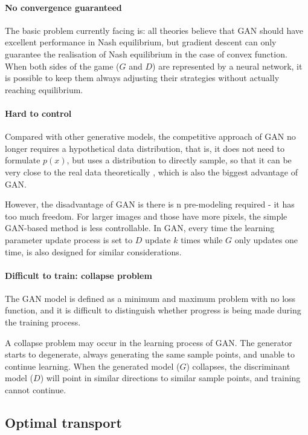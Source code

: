 \documentclass{article}
\begin{document}
\paragraph{No convergence guaranteed}
The basic problem currently facing is: all theories believe that GAN should have excellent performance in Nash equilibrium, but gradient descent can only guarantee the realisation of Nash equilibrium in the case of convex function. When both sides of the game ($G$ and $D$) are represented by a neural network, it is possible to keep them always adjusting their strategies without actually reaching equilibrium.

\paragraph{Hard to control}
Compared with other generative models, the competitive approach of GAN no longer requires a hypothetical data distribution, that is, it does not need to formulate $p(x)$, but uses a distribution to directly sample, so that it can be very close to the real data theoretically , which is also the biggest advantage of GAN.

However, the disadvantage of GAN is there is n pre-modeling required - it has too much freedom. For larger images and those have more pixels, the simple GAN-based method is less controllable. In GAN, every time the learning parameter update process is set to $D$ update $k$ times while $G$ only updates one time, is also designed for similar considerations.

\paragraph{Difficult to train: collapse problem}
The GAN model is defined as a minimum and maximum problem with no loss function, and it is difficult to distinguish whether progress is being made during the training process. 

A collapse problem may occur in the learning process of GAN. The generator starts to degenerate, always generating the same sample points, and unable to continue learning. When the generated model ($G$) collapses, the discriminant model ($D$) will point in similar directions to similar sample points, and training cannot continue.

\subsection{Optimal transport}
\end{document}
